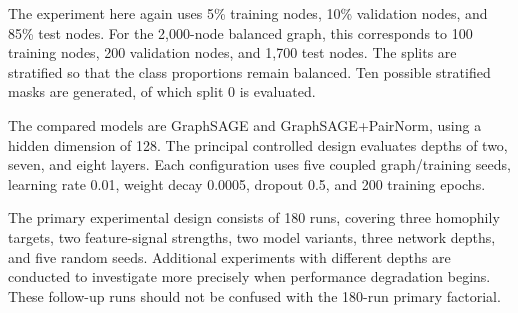 \documentclass[english]{lni}
\begin{document}
The experiment here again uses 5\% training nodes, 10\% validation nodes, and 85\% test nodes. For the 2,000-node balanced graph, this corresponds to 100 training nodes, 200 validation nodes, and 1,700 test nodes. The splits are stratified so that the class proportions remain balanced. Ten possible stratified masks are generated, of which split 0 is evaluated.

The compared models are GraphSAGE and GraphSAGE+PairNorm, using a hidden dimension of 128. The principal controlled design evaluates depths of two, seven, and eight layers. Each configuration uses five coupled graph/training seeds, learning rate 0.01, weight decay 0.0005, dropout 0.5, and 200 training epochs.

The primary experimental design consists of 180 runs, covering three homophily targets, two feature-signal strengths, two model variants, three network depths, and five random seeds. Additional experiments with different depths are conducted to investigate more precisely when performance degradation begins. These follow-up runs should not be confused with the 180-run primary factorial.
\end{document}
